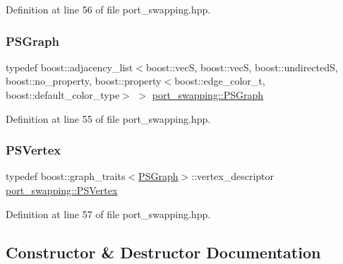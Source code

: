 Definition at line 56 of file port\+\_\+swapping.\+hpp.

\mbox{\label{classport__swapping_a77c6a219f0b86bd9340d8354e3fff755}} 
\subsubsection{\texorpdfstring{P\+S\+Graph}{PSGraph}}
{\footnotesize\ttfamily typedef boost\+::adjacency\+\_\+list$<$boost\+::vecS, boost\+::vecS, boost\+::undirectedS, boost\+::no\+\_\+property, boost\+::property$<$boost\+::edge\+\_\+color\+\_\+t, boost\+::default\+\_\+color\+\_\+type$>$ $>$ \hyperlink{classport__swapping_a77c6a219f0b86bd9340d8354e3fff755}{port\+\_\+swapping\+::\+P\+S\+Graph}\hspace{0.3cm}{\ttfamily [private]}}



Definition at line 55 of file port\+\_\+swapping.\+hpp.

\mbox{\label{classport__swapping_a9588366dd46f9f32aab2c8de93d5679f}} 
\subsubsection{\texorpdfstring{P\+S\+Vertex}{PSVertex}}
{\footnotesize\ttfamily typedef boost\+::graph\+\_\+traits$<$\hyperlink{classport__swapping_a77c6a219f0b86bd9340d8354e3fff755}{P\+S\+Graph}$>$\+::vertex\+\_\+descriptor \hyperlink{classport__swapping_a9588366dd46f9f32aab2c8de93d5679f}{port\+\_\+swapping\+::\+P\+S\+Vertex}\hspace{0.3cm}{\ttfamily [private]}}



Definition at line 57 of file port\+\_\+swapping.\+hpp.



\subsection{Constructor \& Destructor Documentation}
\mbox{\label{classport__swapping_a153922be16a92229d34599fbe1085441}} 
